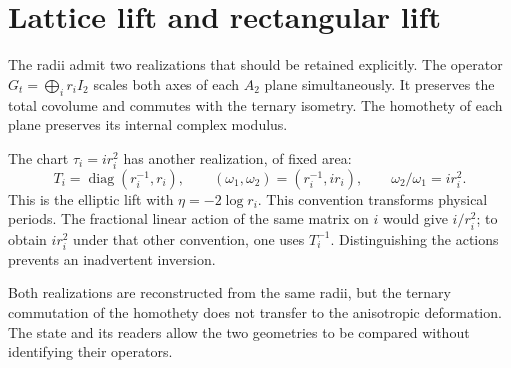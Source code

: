 \section{Lattice lift and rectangular lift}

The radii admit two realizations that should be retained explicitly. The operator \(G_t=\bigoplus_i r_iI_2\) scales both axes of each \(A_2\) plane simultaneously. It preserves the total covolume and commutes with the ternary isometry. The homothety of each plane preserves its internal complex modulus.

The chart \(\tau_i=ir_i^2\) has another realization, of fixed area:
\[
 T_i=\operatorname{diag}(r_i^{-1},r_i),\qquad
 (\omega_1,\omega_2)=(r_i^{-1},ir_i),\qquad
 \omega_2/\omega_1=ir_i^2.
\]
This is the elliptic lift with \(\eta=-2\log r_i\). This convention transforms physical periods. The fractional linear action of the same matrix on \(i\) would give \(i/r_i^2\); to obtain \(ir_i^2\) under that other convention, one uses \(T_i^{-1}\). Distinguishing the actions prevents an inadvertent inversion.

Both realizations are reconstructed from the same radii, but the ternary commutation of the homothety does not transfer to the anisotropic deformation. The state and its readers allow the two geometries to be compared without identifying their operators.
